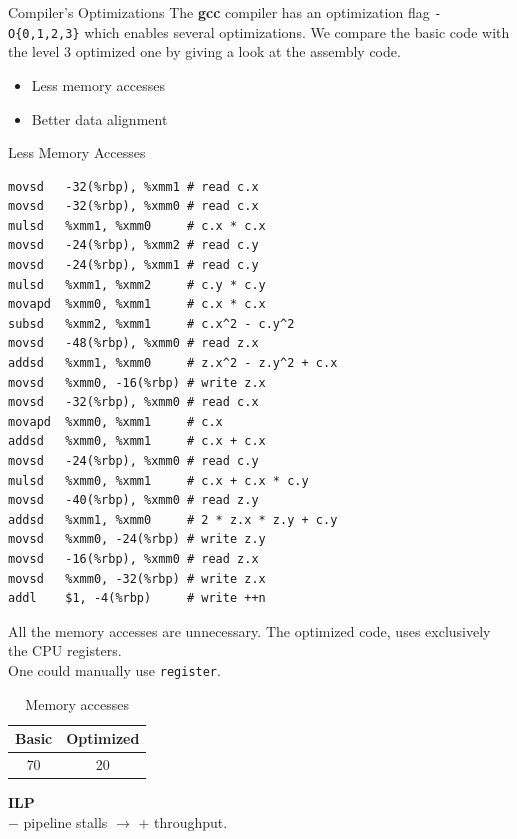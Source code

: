 %
%
\begin{frame}[fragile,t]{Compiler's Optimizations}
    The \textbf{gcc} compiler has an optimization flag \texttt{-O\{0,1,2,3\}} which
    enables several optimizations. We compare the basic code with the
    level 3 optimized one by giving a look at the assembly code. \\
    \begin{itemize}
        \item Less memory accesses
        \item Better data alignment
    \end{itemize}
\end{frame}
%
%
\begin{frame}[fragile,t]{Less Memory Accesses}
    \begin{multicols}{2}
        \begin{lstlisting}[style=asm, basicstyle=\fontsize{6}{7}\selectfont\ttfamily]
movsd	-32(%rbp), %xmm1 # read c.x
movsd	-32(%rbp), %xmm0 # read c.x
mulsd	%xmm1, %xmm0     # c.x * c.x
movsd	-24(%rbp), %xmm2 # read c.y
movsd	-24(%rbp), %xmm1 # read c.y
mulsd	%xmm1, %xmm2     # c.y * c.y
movapd	%xmm0, %xmm1     # c.x * c.x
subsd	%xmm2, %xmm1     # c.x^2 - c.y^2
movsd	-48(%rbp), %xmm0 # read z.x
addsd	%xmm1, %xmm0     # z.x^2 - z.y^2 + c.x
movsd	%xmm0, -16(%rbp) # write z.x
movsd	-32(%rbp), %xmm0 # read c.x
movapd	%xmm0, %xmm1     # c.x
addsd	%xmm0, %xmm1     # c.x + c.x
movsd	-24(%rbp), %xmm0 # read c.y
mulsd	%xmm0, %xmm1     # c.x + c.x * c.y
movsd	-40(%rbp), %xmm0 # read z.y
addsd	%xmm1, %xmm0     # 2 * z.x * z.y + c.y
movsd	%xmm0, -24(%rbp) # write z.y
movsd	-16(%rbp), %xmm0 # read z.x
movsd	%xmm0, -32(%rbp) # write z.x
addl	$1, -4(%rbp)     # write ++n
        \end{lstlisting}

        \columnbreak

        All the memory accesses are unnecessary. The optimized
        code, uses exclusively the CPU registers. \\
        One could manually use \texttt{register}.
        \begin{table}[H]
            \centering
            \begin{tabular}{cc}
                \toprule
                \textbf{Basic} & \textbf{Optimized} \\
                \midrule
                70 & 20 \\
                \bottomrule
            \end{tabular}
            \caption{Memory accesses}
        \end{table}
        \textbf{ILP} \\
        $-$ pipeline stalls $\rightarrow$ $+$ throughput.
    \end{multicols}
\end{frame}
